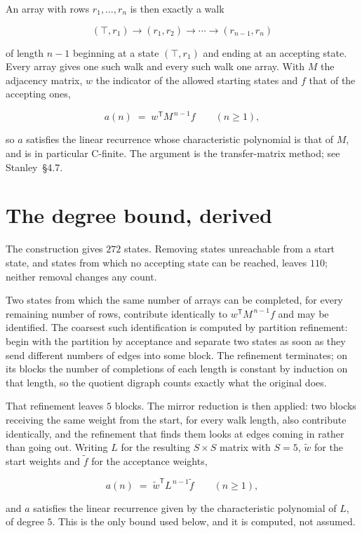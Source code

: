 \documentclass[11pt]{article}
\theoremstyle{definition}
\begin{document}
An array with rows $r_1,\dots,r_n$ is then exactly a walk

\[(\top,r_1) \to (r_1,r_2) \to \cdots \to (r_{n-1},r_n)\]

of length $n-1$ beginning at a state $(\top,r_1)$ and ending at an accepting state. Every array gives one such walk and every such walk one array. With $M$ the adjacency matrix, $w$ the indicator of the allowed starting states and $f$ that of the accepting ones,

\[a(n) \;=\; w^{\mathsf T} M^{\,n-1} f \qquad (n \ge 1),\]

so $a$ satisfies the linear recurrence whose characteristic polynomial is that of $M$, and is in particular C-finite. The argument is the transfer-matrix method; see Stanley~\S4.7.

\section{The degree bound, derived}

The construction gives $272$ states. Removing states unreachable from a start state, and states from which no accepting state can be reached, leaves $110$; neither removal changes any count.

Two states from which the same number of arrays can be completed, for every remaining number of rows, contribute identically to $w^{\mathsf T}M^{\,n-1}f$ and may be identified. The coarsest such identification is computed by partition refinement: begin with the partition by acceptance and separate two states as soon as they send different numbers of edges into some block. The refinement terminates; on its blocks the number of completions of each length is constant by induction on that length, so the quotient digraph counts exactly what the original does.

That refinement leaves $5$ blocks. The mirror reduction is then applied: two blocks receiving the same weight from the start, for every walk length, also contribute identically, and the refinement that finds them looks at edges coming in rather than going out. Writing $L$ for the resulting $S \times S$ matrix with $S = 5$, $\tilde w$ for the start weights and $\tilde f$ for the acceptance weights,

\[a(n) \;=\; \tilde w^{\mathsf T} L^{\,n-1} \tilde f \qquad (n \ge 1),\]

and $a$ satisfies the linear recurrence given by the characteristic polynomial of $L$, of degree $5$. This is the only bound used below, and it is computed, not assumed.
\end{document}
